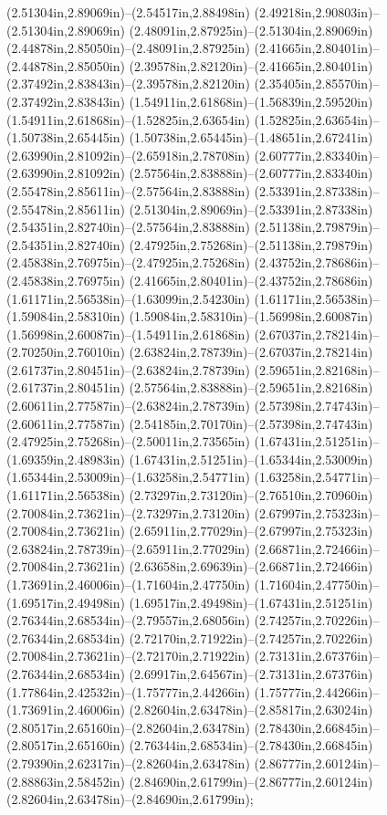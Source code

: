 (2.51304in,2.89069in)--(2.54517in,2.88498in) (2.49218in,2.90803in)--(2.51304in,2.89069in) (2.48091in,2.87925in)--(2.51304in,2.89069in) (2.44878in,2.85050in)--(2.48091in,2.87925in) (2.41665in,2.80401in)--(2.44878in,2.85050in) (2.39578in,2.82120in)--(2.41665in,2.80401in) (2.37492in,2.83843in)--(2.39578in,2.82120in) (2.35405in,2.85570in)--(2.37492in,2.83843in) (1.54911in,2.61868in)--(1.56839in,2.59520in) (1.54911in,2.61868in)--(1.52825in,2.63654in) (1.52825in,2.63654in)--(1.50738in,2.65445in) (1.50738in,2.65445in)--(1.48651in,2.67241in) (2.63990in,2.81092in)--(2.65918in,2.78708in) (2.60777in,2.83340in)--(2.63990in,2.81092in) (2.57564in,2.83888in)--(2.60777in,2.83340in) (2.55478in,2.85611in)--(2.57564in,2.83888in) (2.53391in,2.87338in)--(2.55478in,2.85611in) (2.51304in,2.89069in)--(2.53391in,2.87338in) (2.54351in,2.82740in)--(2.57564in,2.83888in) (2.51138in,2.79879in)--(2.54351in,2.82740in) (2.47925in,2.75268in)--(2.51138in,2.79879in) (2.45838in,2.76975in)--(2.47925in,2.75268in) (2.43752in,2.78686in)--(2.45838in,2.76975in) (2.41665in,2.80401in)--(2.43752in,2.78686in) (1.61171in,2.56538in)--(1.63099in,2.54230in) (1.61171in,2.56538in)--(1.59084in,2.58310in) (1.59084in,2.58310in)--(1.56998in,2.60087in) (1.56998in,2.60087in)--(1.54911in,2.61868in) (2.67037in,2.78214in)--(2.70250in,2.76010in) (2.63824in,2.78739in)--(2.67037in,2.78214in) (2.61737in,2.80451in)--(2.63824in,2.78739in) (2.59651in,2.82168in)--(2.61737in,2.80451in) (2.57564in,2.83888in)--(2.59651in,2.82168in) (2.60611in,2.77587in)--(2.63824in,2.78739in) (2.57398in,2.74743in)--(2.60611in,2.77587in) (2.54185in,2.70170in)--(2.57398in,2.74743in) (2.47925in,2.75268in)--(2.50011in,2.73565in) (1.67431in,2.51251in)--(1.69359in,2.48983in) (1.67431in,2.51251in)--(1.65344in,2.53009in) (1.65344in,2.53009in)--(1.63258in,2.54771in) (1.63258in,2.54771in)--(1.61171in,2.56538in) (2.73297in,2.73120in)--(2.76510in,2.70960in) (2.70084in,2.73621in)--(2.73297in,2.73120in) (2.67997in,2.75323in)--(2.70084in,2.73621in) (2.65911in,2.77029in)--(2.67997in,2.75323in) (2.63824in,2.78739in)--(2.65911in,2.77029in) (2.66871in,2.72466in)--(2.70084in,2.73621in) (2.63658in,2.69639in)--(2.66871in,2.72466in) (1.73691in,2.46006in)--(1.71604in,2.47750in) (1.71604in,2.47750in)--(1.69517in,2.49498in) (1.69517in,2.49498in)--(1.67431in,2.51251in) (2.76344in,2.68534in)--(2.79557in,2.68056in) (2.74257in,2.70226in)--(2.76344in,2.68534in) (2.72170in,2.71922in)--(2.74257in,2.70226in) (2.70084in,2.73621in)--(2.72170in,2.71922in) (2.73131in,2.67376in)--(2.76344in,2.68534in) (2.69917in,2.64567in)--(2.73131in,2.67376in) (1.77864in,2.42532in)--(1.75777in,2.44266in) (1.75777in,2.44266in)--(1.73691in,2.46006in) (2.82604in,2.63478in)--(2.85817in,2.63024in) (2.80517in,2.65160in)--(2.82604in,2.63478in) (2.78430in,2.66845in)--(2.80517in,2.65160in) (2.76344in,2.68534in)--(2.78430in,2.66845in) (2.79390in,2.62317in)--(2.82604in,2.63478in) (2.86777in,2.60124in)--(2.88863in,2.58452in) (2.84690in,2.61799in)--(2.86777in,2.60124in) (2.82604in,2.63478in)--(2.84690in,2.61799in);
